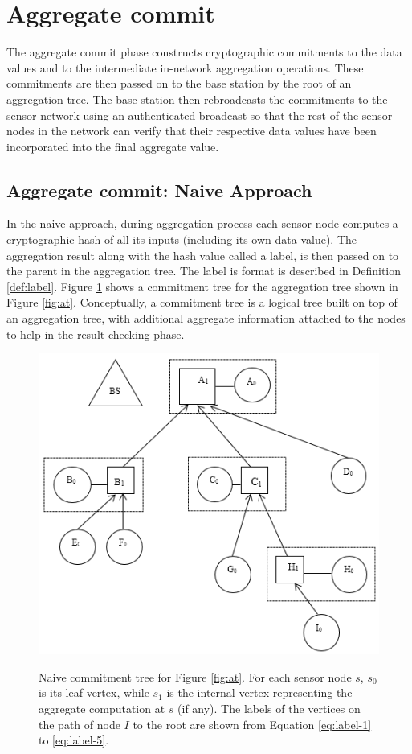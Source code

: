	\section{Aggregate commit} 
		\label{sub:aggregate_commit}
		The aggregate commit phase constructs cryptographic commitments to the data values and to the intermediate in-network aggregation operations.
		These commitments are then passed on to the base station by the root of an aggregation tree.
		The base station then rebroadcasts the commitments to the sensor network using an authenticated broadcast so that the rest of the sensor nodes in the network can verify that their respective data values have been incorporated into the final aggregate value.

		\subsection{Aggregate commit: Naive Approach}
			\label{sub:aggregate_commit_naive_approach}
			In the naive approach, during aggregation process each sensor node computes a cryptographic hash of all its inputs (including its own data value).
			The aggregation result along with the hash value called a label, is then passed on to the parent in the aggregation tree.
			The label is format is described in Definition \ref{def:label}.
			Figure \ref{fig:naive-commitment-tree} shows a commitment tree for the aggregation tree shown in Figure \ref{fig:at}.
			Conceptually, a commitment tree is a logical tree built on top of an aggregation tree, with additional aggregate information attached to the nodes to help in the result checking phase.
			\begin{figure}[h!]
				\centering
				\includegraphics[scale = 1]{images/naive-commitment-tree.png}\\
				\caption{Naive commitment tree for Figure \ref{fig:at}.
				For each sensor node $s$, $s_{0}$ is its leaf vertex, while $s_{1}$ is the internal vertex representing the aggregate computation at $s$ (if any).
				The labels of the vertices on the path of node $I$ to the root are shown from Equation \ref{eq:label-1} to \ref{eq:label-5}.}
				\label{fig:naive-commitment-tree}
			\end{figure}

